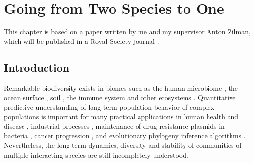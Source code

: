 \chapter{Going from Two Species to One}


\iffalse
"strategic lit review"
"gap"
"thesis" "in this paper I will..."
"roadmap"
"short significance"
\fi


This chapter is based on a paper written by me and my supervisor Anton Zilman, which will be published in a Royal Society journal \cite{Badali2018}. 

\section{Introduction}

\iffalse
Remarkable biodiversity exists in biomes such as the human microbiome \cite{Korem2015,Coburn2015,Palmer2001}, the ocean surface \cite{Hutchinson1961,Cordero2016}, soil \cite{Friedman2016}, the immune system \cite{Weinstein2009,Desponds2015,Stirk2010} and other ecosystems \cite{Tilman1996,Naeem2001}. 
Quantitative predictive understanding of long term population behavior of complex populations is important for many practical applications in human health and disease \cite{Coburn2015,Palmer2001,Kinross2011}, industrial processes \cite{Wolfe2014}, maintenance of drug resistance plasmids in bacteria \cite{Gooding-townsend2015}, cancer progression \cite{Ashcroft2015}, and evolutionary phylogeny inference algorithms \cite{Kingman1982,Rice2004,Blythe2007}. 
Nevertheless, the long term dynamics, diversity and stability of communities of multiple interacting species are still incompletely understood.

